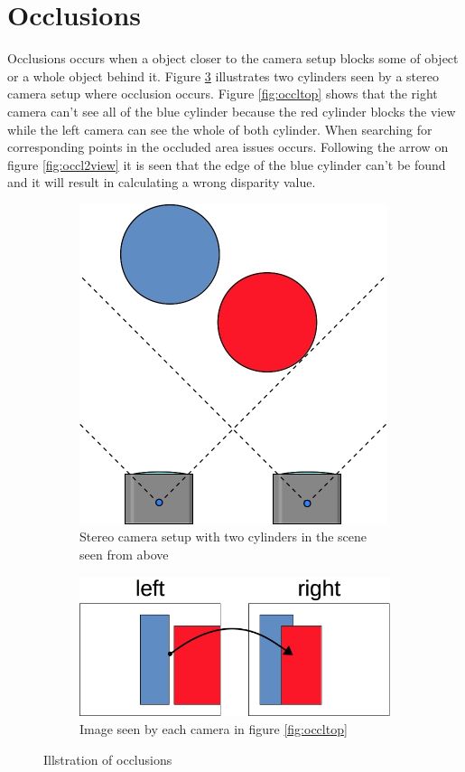  

\section{Occlusions}
Occlusions occurs when a object closer to the camera setup blocks some of object or a whole object behind it. Figure \ref{fig:occlboth} illustrates two cylinders seen by a stereo camera setup where occlusion occurs. Figure \vref{fig:occltop} shows that the right camera can't see all of the blue cylinder because the red cylinder blocks the view while the left camera can see the whole of both cylinder. When searching for corresponding points in the occluded area issues occurs. Following the arrow on figure \vref{fig:occl2view} it is seen that the edge of the blue cylinder can't be found and it will result in calculating a wrong disparity value. \\

\begin{figure}[ht]
  \centering
  \begin{subfigure}[t]{0.45\textwidth}
    \centering\includegraphics[scale=0.4]{figures/occltop.jpg}
    \caption{Stereo camera setup with two cylinders in the scene seen from above\label{fig:occltop}}
  \end{subfigure}\hspace{0.5cm}
  \begin{subfigure}[t]{0.45\textwidth}
    \centering\includegraphics[scale=0.4]{figures/occl2view}
    \caption{Image seen by each camera in figure \vref{fig:occltop}\label{fig:occl2view}}
  \end{subfigure}
  \caption{Illstration of occlusions\label{fig:occlboth}}
\end{figure}

